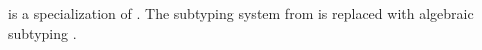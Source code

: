 
\core is a specialization of \eff. The subtyping system from \eff is replaced with algebraic subtyping \cite{mlsub}.